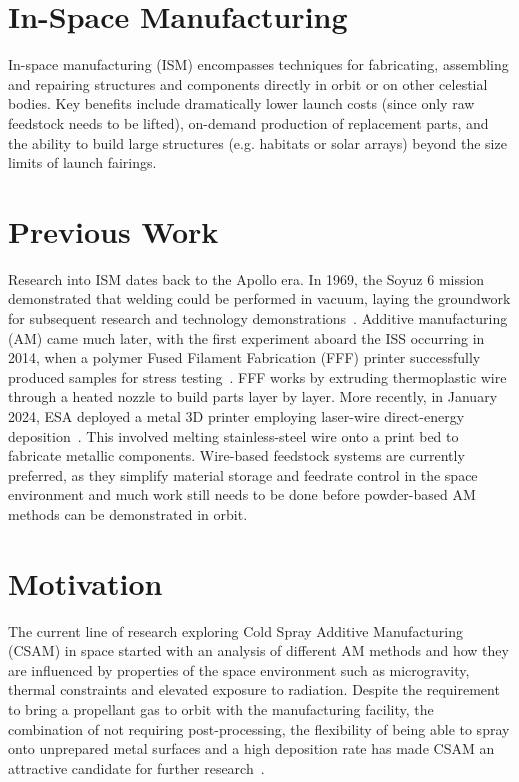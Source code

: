 \section{In-Space Manufacturing}
In-space manufacturing (ISM) encompasses techniques for fabricating, assembling and repairing structures and components directly in orbit or on other celestial bodies. Key benefits include dramatically lower launch costs (since only raw feedstock needs to be lifted), on-demand production of replacement parts, and the ability to build large structures (e.g. habitats or solar arrays) beyond the size limits of launch fairings.

\section{Previous Work}
Research into ISM dates back to the Apollo era. In 1969, the Soyuz 6 mission demonstrated that welding could be performed in vacuum, laying the groundwork for subsequent research and technology demonstrations~\cite{nasa1984welding}. Additive manufacturing (AM) came much later, with the first experiment aboard the ISS occurring in 2014, when a polymer Fused Filament Fabrication (FFF) printer successfully produced samples for stress testing~\cite{Prater2019}. FFF works by extruding thermoplastic wire through a heated nozzle to build parts layer by layer. More recently, in January 2024, ESA deployed a metal 3D printer employing laser-wire direct-energy deposition~\cite{ESA2024Metal3DPrinter}. This involved melting stainless-steel wire onto a print bed to fabricate metallic components. Wire-based feedstock systems are currently preferred, as they simplify material storage and feedrate control in the space environment and much work still needs to be done before powder-based AM methods can be demonstrated in orbit.

\section{Motivation}
The current line of research exploring Cold Spray Additive Manufacturing (CSAM) in space started with an analysis of different AM methods and how they are influenced by properties of the space environment such as microgravity, thermal constraints and elevated exposure to radiation. Despite the requirement to bring a propellant gas to orbit with the manufacturing facility, the combination of not requiring post-processing, the flexibility of being able to spray onto unprepared metal surfaces and a high deposition rate has made CSAM an attractive candidate for further research~\cite{malagowski2019amspace}.

